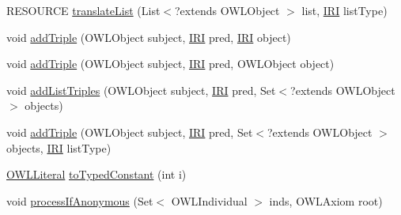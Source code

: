 \begin{DoxyCompactItemize}
\item 
R\-E\-S\-O\-U\-R\-C\-E \hyperlink{classorg_1_1coode_1_1owlapi_1_1rdf_1_1model_1_1_abstract_translator_3_01_n_o_d_e_00_01_r_e_s_o_ubc597564c2cb8c8d2b0139cb32f3f91c_a86d9c5083597aeb8ac371581ef76b536}{translate\-List} (List$<$?extends O\-W\-L\-Object $>$ list, \hyperlink{classorg_1_1semanticweb_1_1owlapi_1_1model_1_1_i_r_i}{I\-R\-I} list\-Type)
\item 
void \hyperlink{classorg_1_1coode_1_1owlapi_1_1rdf_1_1model_1_1_abstract_translator_3_01_n_o_d_e_00_01_r_e_s_o_ubc597564c2cb8c8d2b0139cb32f3f91c_a6494b8c4c5d29fcc83b5f87d447dbf22}{add\-Triple} (O\-W\-L\-Object subject, \hyperlink{classorg_1_1semanticweb_1_1owlapi_1_1model_1_1_i_r_i}{I\-R\-I} pred, \hyperlink{classorg_1_1semanticweb_1_1owlapi_1_1model_1_1_i_r_i}{I\-R\-I} object)
\item 
void \hyperlink{classorg_1_1coode_1_1owlapi_1_1rdf_1_1model_1_1_abstract_translator_3_01_n_o_d_e_00_01_r_e_s_o_ubc597564c2cb8c8d2b0139cb32f3f91c_ab4fa299632afd14681eb7cdc1b8f3a3d}{add\-Triple} (O\-W\-L\-Object subject, \hyperlink{classorg_1_1semanticweb_1_1owlapi_1_1model_1_1_i_r_i}{I\-R\-I} pred, O\-W\-L\-Object object)
\item 
void \hyperlink{classorg_1_1coode_1_1owlapi_1_1rdf_1_1model_1_1_abstract_translator_3_01_n_o_d_e_00_01_r_e_s_o_ubc597564c2cb8c8d2b0139cb32f3f91c_a259f51f456279aaf1abb76ccf09798c4}{add\-List\-Triples} (O\-W\-L\-Object subject, \hyperlink{classorg_1_1semanticweb_1_1owlapi_1_1model_1_1_i_r_i}{I\-R\-I} pred, Set$<$?extends O\-W\-L\-Object $>$ objects)
\item 
void \hyperlink{classorg_1_1coode_1_1owlapi_1_1rdf_1_1model_1_1_abstract_translator_3_01_n_o_d_e_00_01_r_e_s_o_ubc597564c2cb8c8d2b0139cb32f3f91c_a8f911e9621b2366e46aefa484990faf7}{add\-Triple} (O\-W\-L\-Object subject, \hyperlink{classorg_1_1semanticweb_1_1owlapi_1_1model_1_1_i_r_i}{I\-R\-I} pred, Set$<$?extends O\-W\-L\-Object $>$ objects, \hyperlink{classorg_1_1semanticweb_1_1owlapi_1_1model_1_1_i_r_i}{I\-R\-I} list\-Type)
\item 
\hyperlink{interfaceorg_1_1semanticweb_1_1owlapi_1_1model_1_1_o_w_l_literal}{O\-W\-L\-Literal} \hyperlink{classorg_1_1coode_1_1owlapi_1_1rdf_1_1model_1_1_abstract_translator_3_01_n_o_d_e_00_01_r_e_s_o_ubc597564c2cb8c8d2b0139cb32f3f91c_a214b21d6e09209c46b81dbf6b26302b8}{to\-Typed\-Constant} (int i)
\item 
void \hyperlink{classorg_1_1coode_1_1owlapi_1_1rdf_1_1model_1_1_abstract_translator_3_01_n_o_d_e_00_01_r_e_s_o_ubc597564c2cb8c8d2b0139cb32f3f91c_a3148aa8640a3f158cba1420dda739870}{process\-If\-Anonymous} (Set$<$ O\-W\-L\-Individual $>$ inds, O\-W\-L\-Axiom root)

\end{DoxyCompactItemize}
